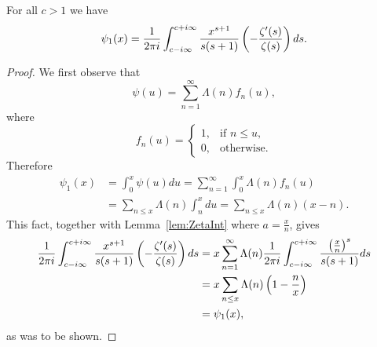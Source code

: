 \begin{proposition}\label{pro:ZetaQuotInt}
	For all $c > 1$ we have
\begin{equation*}
	\psi_1(x) = \frac{1}{2 \pi i} \int _{c - i\infty} ^{c + i \infty} \frac{x^{s + 1}}{s(s + 1)} \left(-\frac{\zeta'(s)}{\zeta(s)}\right) ds.
\end{equation*}
\end{proposition}
\begin{proof}
	We first observe that
\begin{equation*}
	\psi(u) = \sum _{n=1} ^\infty \Lambda(n) f_n(u),
\end{equation*}
	where
\begin{equation*}
	f_n(u) = 
		\left\{
    		\begin{array}{ll}
        		1, &\text{if } n \leq u,\\
        		0, &\text{otherwise}.
        	\end{array}
		\right.
\end{equation*}
	Therefore
\begin{equation*}
\begin{aligned}	
	\psi_1(x)
		&= \int _0 ^x \psi(u) du = \sum _{n = 1} ^\infty \int _0 ^x \Lambda(n) f_n(u) \\ 
		&= \sum _{n \leq x} \Lambda(n) \int _n ^x du = \sum _{n \leq x} \Lambda(n)(x - n).
\end{aligned}
\end{equation*}
	This fact, together with Lemma~\ref{lem:ZetaInt} where $a = \frac{x}{n}$, gives
\begin{equation*}
\begin{aligned}	
	\frac{1}{2 \pi i} \int _{c - i\infty} ^{c + i \infty} \frac{x^{s + 1}}{s(s + 1)} \left(-\frac{\zeta'(s)}{\zeta(s)}\right) ds 
		&= x \sum _{n = 1} ^\infty \Lambda(n) \frac{1}{2 \pi i} \int _{c - i \infty} ^{c + i \infty} \frac{\left(\frac{x}{n}\right)^s}{s(s + 1)} ds \\
		&= x \sum _{n \leq x} \Lambda(n) \left(1 - \frac{n}{x}\right) \\
		&= \psi_1(x),
\end{aligned}
\end{equation*}
	as was to be shown.
\end{proof}


